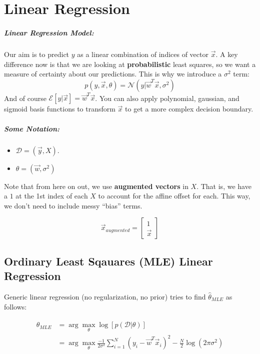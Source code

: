 \documentclass[a4paper,12pt]{report}
\begin{document}
\chapter{Linear Regression}

\paragraph{Linear Regression Model: } Our aim is to predict $y$ as a linear combination of indices of vector $\vec x$. A key difference now is that we are looking at \textbf{probabilistic} least squares, so we want a measure of certainty about our predictions. This is why we introduce a $\sigma^2$ term:
\begin{equation}
p(y, \vec x, \theta) = \mathcal N(y | \vec w^T\vec x, \sigma^2)
\end{equation}
And of course $\mathcal E[y|\vec x] = \vec w^T \vec x$. You can also apply polynomial, gaussian, and sigmoid basis functions to transform $\vec x$ to get a more complex decision boundary.

\paragraph{Some Notation: } 
\begin{itemize}
\item $\mathcal D = (\vec y, X)$.
\item $\theta = (\vec w, \sigma^2)$
\end{itemize}
Note that from here on out, we use \textbf{augmented vectors} in $X$. That is, we have a $1$ at the 1st index of each $X$ to account for the affine offset for each. This way, we don't need to include messy ``bias'' terms.

$$\vec x_{augmented} = \begin{bmatrix} 1\\\vec x \end{bmatrix}$$




\section{Ordinary Least Sqauares (MLE) Linear Regression}

Generic linear regression (no regularization, no prior) tries to find $\hat \theta_{MLE}$ as follows: 

\begin{equation}
\begin{split}
\hat \theta_{MLE} &= \arg\max_{\theta} \log[p(\mathcal D | \theta)] \\
&= \arg\max_{\theta} \frac{-1}{2\sigma^2} \sum_{i=1}^{N} (y_i - \vec w^T \vec x_i)^2 - \frac{N}{2} \log(2\pi\sigma^2)
\end{split}
\end{equation}
\end{document}
